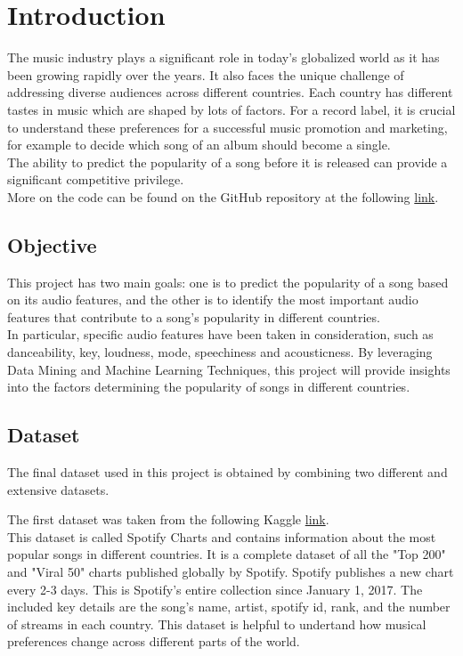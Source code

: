 \chapter{Introduction}

The music industry plays a significant role in today’s globalized world as it has been growing rapidly over the years. It also faces the unique challenge of addressing diverse audiences across
different countries. Each country has different tastes in music which are shaped
by lots of factors. For a record label, it is crucial to understand these preferences for a successful music promotion and marketing, for example to decide which song of an album should become a single.\\ The ability to predict
the popularity of a song before it is released can provide a significant 
competitive privilege.\\
More on the code can be found on the GitHub repository at the following \href{https://github.com/noemichem/Data-mining-project}{link}.\\

\section{Objective}
This project has two main goals: one is to predict the popularity of a song based on its audio features, and the other is to identify the most important audio features that contribute to a song's popularity in different countries.\\
In particular, specific audio features have been taken in consideration,  
such as danceability, key, loudness, mode, speechiness and acousticness. 
By leveraging Data Mining and Machine Learning Techniques, this project will provide insights into
the factors determining the popularity of songs in different countries.\\

\section{Dataset}
The final dataset used in this project is obtained by combining two different and extensive datasets.

The first dataset was taken from the following Kaggle \href{https://www.kaggle.com/datasets/dhruvildave/spotify-charts/data} {link}. \\

This dataset is called Spotify Charts and contains information about the most popular songs in different countries. It is a complete dataset 
of all the "Top 200" and "Viral 50" charts published globally by Spotify. Spotify publishes a new chart
 every 2-3 days. This is Spotify's entire collection since January 1, 2017.
 The included key details are the song's name, artist, spotify id, rank, and the number of streams 
 in each country. This dataset is helpful to undertand how musical preferences change across different
 parts of the world. \\

